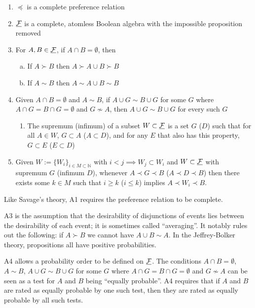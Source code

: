 \begin{enumerate}[A1:]
    \item $\preceq$ is a complete preference relation
    \item $\underline{\mathcal{F}}$ is a complete, atomless Boolean algebra with the impossible proposition removed
    \item For $A,B\in \underline{\mathcal{F}}$, if $A\cap B=\emptyset$, then
    \begin{enumerate}[a)]
        \item If $A\succ B$ then $A\succ A\cup B \succ B$
        \item If $A\sim B$ then $A\sim A\cup B \sim B$
    \end{enumerate}
    \item Given $A\cap B=\emptyset$ and $A\sim B$, if $A\cup G\sim B\cup G$ for some $G$ where $A\cap G=B\cap G=\emptyset$ and $G\not\sim A$, then $A\cup G\sim B\cup G$ for every such $G$
    \begin{enumerate}[D1:]
        \item The supremum (infimum) of a subset $W\subset \underline{\mathcal{F}}$ is a set $G$ ($D$) such that for all $A\in W$, $G\subset A$ ($A\subset D$), and for any $E$ that also has this property, $G\subset E$ ($E\subset D$)
    \end{enumerate}
    \item Given $W:= \{W_i\}_{i\in M\subset \mathbb{N}}$ with $i<j\implies W_j\subset W_i$ and $W\subset \underline{\mathcal{F}}$ with supremum $G$ (infimum $D$), whenever $A\prec G \prec B$ ($A\prec D\prec B$) then there exists some $k\in M$ such that $i\geq k$ ($i\leq k$) implies $A\prec W_i \prec B$.
\end{enumerate}

Like Savage's theory, A1 requires the preference relation to be complete.

A3 is the assumption that the desirability of disjunctions of events lies between the desirability of each event; it is sometimes called ``averaging''. It notably rules out the following: if $A\succ B$ we cannot have $A\cup B\sim A$. In the Jeffrey-Bolker theory, propositions all have positive probabilities.

A4 allows a probability order to be defined on $\underline{\mathcal{F}}$. The conditions $A\cap B=\emptyset$, $A\sim B$, $A\cup G\sim B\cup G$ for some $G$ where $A\cap G=B\cap G=\emptyset$ and $G\not\sim A$ can be seen as a test for $A$ and $B$ being ``equally probable''. A4 requires that if $A$ and $B$ are rated as equally probable by one such test, then they are rated as equally probable by all such tests.

